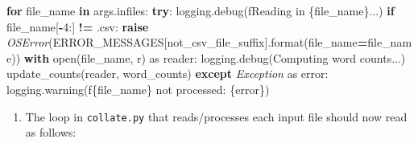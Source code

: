 \documentclass[
]{krantz}
\makeatletter
\newenvironment{Shaded}{\begin{snugshade}}{\end{snugshade}}
\newcommand{\BuiltInTok}[1]{#1}
\newcommand{\ControlFlowTok}[1]{\textcolor[rgb]{0.13,0.29,0.53}{\textbf{#1}}}
\newcommand{\DecValTok}[1]{\textcolor[rgb]{0.00,0.00,0.81}{#1}}
\newcommand{\ImportTok}[1]{#1}
\newcommand{\KeywordTok}[1]{\textcolor[rgb]{0.13,0.29,0.53}{\textbf{#1}}}
\newcommand{\NormalTok}[1]{#1}
\newcommand{\OperatorTok}[1]{\textcolor[rgb]{0.81,0.36,0.00}{\textbf{#1}}}
\newcommand{\PreprocessorTok}[1]{\textcolor[rgb]{0.56,0.35,0.01}{\textit{#1}}}
\newcommand{\SpecialCharTok}[1]{\textcolor[rgb]{0.00,0.00,0.00}{#1}}
\newcommand{\SpecialStringTok}[1]{\textcolor[rgb]{0.31,0.60,0.02}{#1}}
\newcommand{\StringTok}[1]{\textcolor[rgb]{0.31,0.60,0.02}{#1}}
\providecommand{\tightlist}{%
  \setlength{\itemsep}{0pt}\setlength{\parskip}{0pt}}
\newenvironment{kframe}{%
\medskip{}
\setlength{\fboxsep}{.8em}
 \def\at@end@of@kframe{}%
 \ifinner\ifhmode%
  \def\at@end@of@kframe{\end{minipage}}%
  \begin{minipage}{\columnwidth}%
 \fi\fi%
 \def\FrameCommand##1{\hskip\@totalleftmargin \hskip-\fboxsep
 \colorbox{shadecolor}{##1}\hskip-\fboxsep
     \hskip-\linewidth \hskip-\@totalleftmargin \hskip\columnwidth}%
 \MakeFramed {\advance\hsize-\width
   \@totalleftmargin\z@ \linewidth\hsize
   \@setminipage}}%
 {\par\unskip\endMakeFramed%
 \at@end@of@kframe}
\renewenvironment{Shaded}{\begin{kframe}}{\end{kframe}}
\makeatother
\begin{document}
\begin{Shaded}
\begin{Highlighting}[]
\ControlFlowTok{for}\NormalTok{ file\_name }\KeywordTok{in}\NormalTok{ args.infiles:}
    \ControlFlowTok{try}\NormalTok{:}
\NormalTok{        logging.debug(}\SpecialStringTok{f\textquotesingle{}Reading in }\SpecialCharTok{\{}\NormalTok{file\_name}\SpecialCharTok{\}}\SpecialStringTok{...\textquotesingle{}}\NormalTok{)}
        \ControlFlowTok{if}\NormalTok{ file\_name[}\OperatorTok{{-}}\DecValTok{4}\NormalTok{:] }\OperatorTok{!=} \StringTok{\textquotesingle{}.csv\textquotesingle{}}\NormalTok{:}
            \ControlFlowTok{raise} \PreprocessorTok{OSError}\NormalTok{(ERROR\_MESSAGES[}\StringTok{\textquotesingle{}not\_csv\_file\_suffix\textquotesingle{}}\NormalTok{].}\BuiltInTok{format}\NormalTok{(file\_name}\OperatorTok{=}\NormalTok{file\_name))}
        \ControlFlowTok{with} \BuiltInTok{open}\NormalTok{(file\_name, }\StringTok{\textquotesingle{}r\textquotesingle{}}\NormalTok{) }\ImportTok{as}\NormalTok{ reader:}
\NormalTok{            logging.debug(}\StringTok{\textquotesingle{}Computing word counts...\textquotesingle{}}\NormalTok{)}
\NormalTok{            update\_counts(reader, word\_counts)}
    \ControlFlowTok{except} \PreprocessorTok{Exception} \ImportTok{as}\NormalTok{ error:}
\NormalTok{        logging.warning(}\SpecialStringTok{f\textquotesingle{}}\SpecialCharTok{\{}\NormalTok{file\_name}\SpecialCharTok{\}}\SpecialStringTok{ not processed: }\SpecialCharTok{\{}\NormalTok{error}\SpecialCharTok{\}}\SpecialStringTok{\textquotesingle{}}\NormalTok{)}
\end{Highlighting}
\end{Shaded}

\begin{enumerate}
\def\labelenumi{\arabic{enumi}.}
\setcounter{enumi}{1}
\tightlist
\item
  The loop in \texttt{collate.py} that reads/processes each input file
  should now read as follows:
\end{enumerate}
\end{document}
